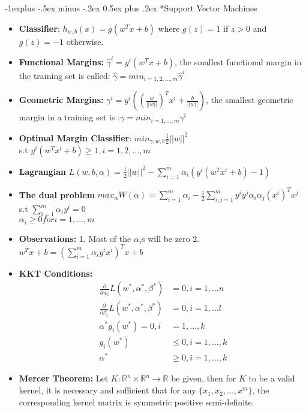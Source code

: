 \documentclass[10pt,landscape]{article}
\makeatletter
\renewcommand{\subsection}{\@startsection{subsection}{2}{0mm}%
                                {-1explus -.5ex minus -.2ex}%
                                {0.5ex plus .2ex}%
                                {\normalfont\normalsize\bfseries}}
\makeatother
\begin{document}
\begin{multicols}{3}
\subsection*{Support Vector Machines}
\begin{itemize}
\item \textbf{Classifier}: $h_{w, b}(x) = g(w^Tx+b) $ where $g(z) = 1$ if $z >0$ and $g(z) = -1$ otherwise. 
\item \textbf{Functional Margins:} $\hat{\gamma}^i = y^i (w^Tx +b)$, the smallest functional margin in the training set is called: $\hat{\gamma} = min_{i = 1, 2, \dots, m} \hat{\gamma}^i$
\item \textbf{Geometric Margins:} $\gamma^i = y^i ((\frac{w}{||w||})^T x^i + \frac{b}{||w||})$, the smallest geometric margin in a training set is :$ \gamma = min_{i = 1, \dots, m} \gamma^i$
\item \textbf{Optimal Margin Classifier}: $min_{\gamma, w, b} \frac{1}{2} ||w||^2$\\
s.t $y^i(w^Tx^i +b) \geq 1, i = 1, 2, \dots, m$
\item \textbf{Lagrangian} $ L(w, b, \alpha) = \frac{1}{2} ||w||^2 - \sum_{i = 1}^{m}\alpha_i (y^i (w^Tx^i +b)-1)$
\item \textbf{The dual problem } $max_\alpha W(\alpha) = \sum_{i = 1}^{m}\alpha_i - \frac{1}{2}\sum_{i, j = 1}^{m}y^i y^j \alpha_i \alpha_j (x^i)^Tx^j$\\
s.t $\sum_{i = 1}^{m}\alpha_i y^i = 0$\\
$\alpha_i \geq 0 for i = 1, \dots, m$
\item \textbf{Observations:} 1. Most of the $\alpha_i$s will be zero 2. $w^Tx +b = (\sum_{i = 1}^{m} \alpha_i y^i x^i )^T x +b $
\item \textbf{KKT Conditions:}
\begin{align*}
\frac{\partial }{\partial w_i} L(w^*, \alpha^*, \beta^*) &= 0, i = 1, \dots n\\
\frac{\partial }{\partial \beta_i} L(w^*, \alpha^*, \beta^*) &= 0, i = 1, \dots l\\
\alpha^*g_i(w^*) = 0, i &= 1, \dots, k\\
g_i(w^*) &\leq 0, i = 1, \dots, k\\
\alpha^* &\geq 0, i = 1, \dots, k
\end{align*}
\item \textbf{Mercer Theorem:} Let $K: \mathbb{R}^n \times \mathbb{R}^n \rightarrow \mathbb{R}$ be given, then for $K$ to be a valid kernel, it is necessary and sufficient that for any $\{x_1, x_2, \dots, x^m\}$, the corresponding kernel matrix is symmetric positive semi-definite. 

\end{itemize}
\end{multicols}
\end{document}
